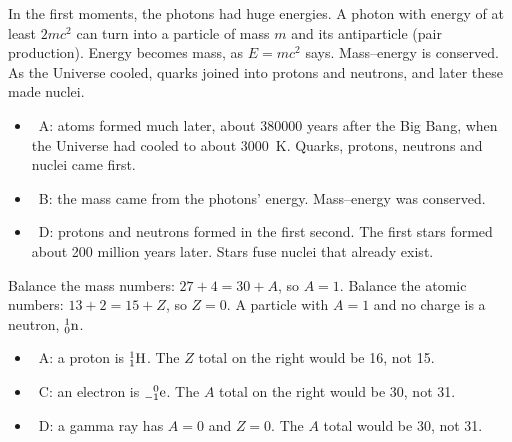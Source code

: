 \providecommand\pracNuc[3]{\ensuremath{\mathord{%
  \setbox0=\hbox{$\scriptstyle#1$}\setbox2=\hbox{$\scriptstyle#2$}%
  \ifdim\wd0<\wd2 \setbox0=\hbox to\wd2{\hss\box0}\else\setbox2=\hbox to\wd0{\hss\box2}\fi
  {}^{\box0}_{\box2}\mathrm{#3}}}}
\providecommand\pracaq[1]{\ensuremath{\overline{\mathrm{#1}}}}

\begin{practiceanswers}

\begin{practiceans}
  In the first moments, the photons had huge energies. A photon with energy of at least
  $2mc^2$ can turn into a particle of mass $m$ and its antiparticle (pair production).
  Energy becomes mass, as $E = mc^2$ says. Mass--energy is conserved. As the Universe
  cooled, quarks joined into protons and neutrons, and later these made nuclei.
  \begin{itemize}
    \item \xmark\ A: atoms formed much later, about \num{380000} years after the Big Bang,
          when the Universe had cooled to about \qty{3000}{K}. Quarks, protons, neutrons and
          nuclei came first.
    \item \xmark\ B: the mass came from the photons' energy. Mass--energy was conserved.
    \item \xmark\ D: protons and neutrons formed in the first second. The first stars formed
          about 200 million years later. Stars fuse nuclei that already exist.
  \end{itemize}
\end{practiceans}

\begin{practiceans}
  Balance the mass numbers: $27 + 4 = 30 + A$, so $A = 1$. Balance the atomic numbers:
  $13 + 2 = 15 + Z$, so $Z = 0$. A particle with $A = 1$ and no charge is a neutron,
  $\pracNuc{1}{0}{n}$.
  \begin{itemize}
    \item \xmark\ A: a proton is $\pracNuc{1}{1}{H}$. The $Z$ total on the right would be 16,
          not 15.
    \item \xmark\ C: an electron is $\pracNuc{0}{-1}{e}$. The $A$ total on the right would be
          30, not 31.
    \item \xmark\ D: a gamma ray has $A = 0$ and $Z = 0$. The $A$ total would be 30, not 31.
  \end{itemize}
\end{practiceans}


\end{practiceanswers}
